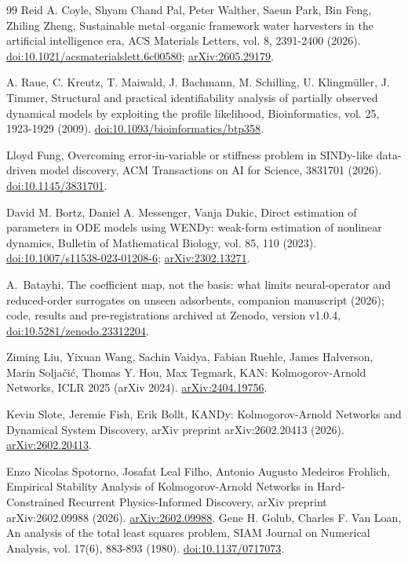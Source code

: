 \documentclass[11pt]{article}
\begin{document}
\begin{thebibliography}{99}
 Reid A. Coyle, Shyam Chand Pal, Peter Walther, Saeun Park, Bin Feng, Zhiling Zheng, Sustainable metal--organic framework water harvesters in the artificial intelligence era, ACS Materials Letters, vol. 8, 2391-2400 (2026). \href{https://doi.org/10.1021/acsmaterialslett.6c00580}{doi:10.1021/acsmaterialslett.6c00580}; \href{https://arxiv.org/abs/2605.29179}{arXiv:2605.29179}.

 A. Raue, C. Kreutz, T. Maiwald, J. Bachmann, M. Schilling, U. Klingmüller, J. Timmer, Structural and practical identifiability analysis of partially observed dynamical models by exploiting the profile likelihood, Bioinformatics, vol. 25, 1923-1929 (2009). \href{https://doi.org/10.1093/bioinformatics/btp358}{doi:10.1093/bioinformatics/btp358}.

 Lloyd Fung, Overcoming error-in-variable or stiffness problem in SINDy-like data-driven model discovery, ACM Transactions on AI for Science, 3831701 (2026). \href{https://doi.org/10.1145/3831701}{doi:10.1145/3831701}.

 David M. Bortz, Daniel A. Messenger, Vanja Dukic, Direct estimation of parameters in ODE models using WENDy: weak-form estimation of nonlinear dynamics, Bulletin of Mathematical Biology, vol. 85, 110 (2023). \href{https://doi.org/10.1007/s11538-023-01208-6}{doi:10.1007/s11538-023-01208-6}; \href{https://arxiv.org/abs/2302.13271}{arXiv:2302.13271}.

 A.~Batayhi, The coefficient map, not the basis: what limits neural-operator and reduced-order surrogates on unseen adsorbents, companion manuscript (2026); code, results and pre-registrations archived at Zenodo, version v1.0.4, \href{https://doi.org/10.5281/zenodo.23312204}{doi:10.5281/zenodo.23312204}.

 Ziming Liu, Yixuan Wang, Sachin Vaidya, Fabian Ruehle, James Halverson, Marin Solja\v{c}i\'c, Thomas Y. Hou, Max Tegmark, KAN: Kolmogorov-Arnold Networks, ICLR 2025 (arXiv 2024). \href{https://arxiv.org/abs/2404.19756}{arXiv:2404.19756}.

 Kevin Slote, Jeremie Fish, Erik Bollt, KANDy: Kolmogorov-Arnold Networks and Dynamical System Discovery, arXiv preprint arXiv:2602.20413 (2026). \href{https://arxiv.org/abs/2602.20413}{arXiv:2602.20413}.

 Enzo Nicolas Spotorno, Josafat Leal Filho, Antonio Augusto Medeiros Frohlich, Empirical Stability Analysis of Kolmogorov-Arnold Networks in Hard-Constrained Recurrent Physics-Informed Discovery, arXiv preprint arXiv:2602.09988 (2026). \href{https://arxiv.org/abs/2602.09988}{arXiv:2602.09988}.
 Gene H. Golub, Charles F. Van Loan, An analysis of the total least squares problem, SIAM Journal on Numerical Analysis, vol. 17(6), 883-893 (1980). \href{https://doi.org/10.1137/0717073}{doi:10.1137/0717073}.


\end{thebibliography}
\end{document}
